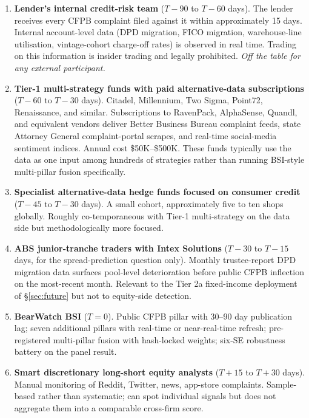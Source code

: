 \documentclass[11pt,a4paper]{article}
\begin{document}
\begin{enumerate}
\item \textbf{Lender's internal credit-risk team} ($T - 90$ to $T - 60$ days). The lender receives every CFPB complaint filed against it within approximately 15 days. Internal account-level data (DPD migration, FICO migration, warehouse-line utilisation, vintage-cohort charge-off rates) is observed in real time. Trading on this information is insider trading and legally prohibited. \emph{Off the table for any external participant.}

\item \textbf{Tier-1 multi-strategy funds with paid alternative-data subscriptions} ($T - 60$ to $T - 30$ days). Citadel, Millennium, Two Sigma, Point72, Renaissance, and similar. Subscriptions to RavenPack, AlphaSense, Quandl, and equivalent vendors deliver Better Business Bureau complaint feeds, state Attorney General complaint-portal scrapes, and real-time social-media sentiment indices. Annual cost \$50K--\$500K. These funds typically use the data as one input among hundreds of strategies rather than running BSI-style multi-pillar fusion specifically.

\item \textbf{Specialist alternative-data hedge funds focused on consumer credit} ($T - 45$ to $T - 30$ days). A small cohort, approximately five to ten shops globally. Roughly co-temporaneous with Tier-1 multi-strategy on the data side but methodologically more focused.

\item \textbf{ABS junior-tranche traders with Intex Solutions} ($T - 30$ to $T - 15$ days, for the spread-prediction question only). Monthly trustee-report DPD migration data surfaces pool-level deterioration before public CFPB inflection on the most-recent month. Relevant to the Tier 2a fixed-income deployment of §\ref{sec:future} but not to equity-side detection.

\item \textbf{BearWatch BSI} ($T = 0$). Public CFPB pillar with 30--90 day publication lag; seven additional pillars with real-time or near-real-time refresh; pre-registered multi-pillar fusion with hash-locked weights; six-SE robustness battery on the panel result.

\item \textbf{Smart discretionary long-short equity analysts} ($T + 15$ to $T + 30$ days). Manual monitoring of Reddit, Twitter, news, app-store complaints. Sample-based rather than systematic; can spot individual signals but does not aggregate them into a comparable cross-firm score.


\end{enumerate}
\end{document}
